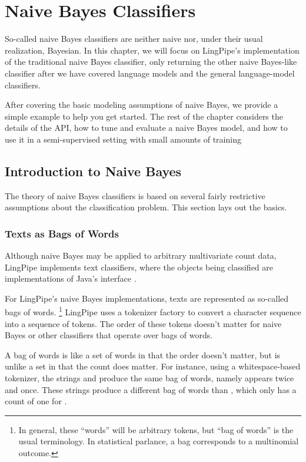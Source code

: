 \chapter{Naive Bayes Classifiers}\label{chap:naive-bayes}

So-called naive Bayes classifiers are neither naive nor, under their
usual realization, Bayesian.  In this chapter, we will focus on
LingPipe's implementation of the traditional naive Bayes classifier,
only returning the other naive Bayes-like classifier after we have
covered language models and the general language-model classifiers.

After covering the basic modeling assumptions of naive Bayes, we
provide a simple example to help you get started.  The rest of the
chapter considers the details of the API, how to tune and evaluate a
naive Bayes model, and how to use it in a semi-supervised setting with
small amounts of training



\section{Introduction to Naive Bayes}

The theory of naive Bayes classifiers is based on several fairly
restrictive assumptions about the classification problem.  This
section lays out the basics.

\subsection{Texts as Bags of Words}

Although naive Bayes may be applied to arbitrary multivariate count
data, LingPipe implements text classifiers, where the objects being
classified are implementations of Java's  interface
.

For LingPipe's naive Bayes implementations, texts are represented as
so-called bags of words.%
%
\footnote{In general, these ``words'' will be arbitrary tokens, but
  ``bag of words'' is the usual terminology.  In statistical parlance,
  a bag corresponds to a multinomial outcome.}
%
LingPipe uses a tokenizer factory to convert a character sequence into
a sequence of tokens.  The order of these tokens doesn't matter for
naive Bayes or other classifiers that operate over bags of words.

A bag of words is like a set of words in that the order doesn't
matter, but is unlike a set in that the count does matter.  For
instance, using a whitespace-based tokenizer, the strings
 and  produce
the same bag of words, namely  appears twice and
 once.  These strings produce a different bag of
words than , which only has a count of one for
.


